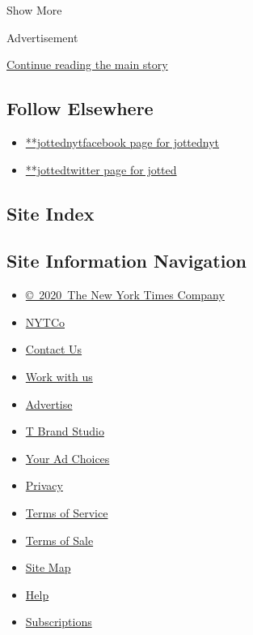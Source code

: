 Show More

Advertisement

\protect\hyperlink{after-mid2}{Continue reading the main story}

\hypertarget{follow-elsewhere}{%
\subsection{Follow Elsewhere}\label{follow-elsewhere}}

\begin{itemize}
\tightlist
\item
  \href{https://www.facebook.com/jottednyt}{**jottednytfacebook page for
  jottednyt}
\item
  \href{https://twitter.com/jotted}{**jottedtwitter page for jotted}
\end{itemize}

\hypertarget{site-index}{%
\subsection{Site Index}\label{site-index}}

\hypertarget{site-information-navigation}{%
\subsection{Site Information
Navigation}\label{site-information-navigation}}

\begin{itemize}
\tightlist
\item
  \href{https://help.nytimes.com/hc/en-us/articles/115014792127-Copyright-notice}{©~2020~The
  New York Times Company}
\end{itemize}

\begin{itemize}
\tightlist
\item
  \href{https://www.nytco.com/}{NYTCo}
\item
  \href{https://help.nytimes.com/hc/en-us/articles/115015385887-Contact-Us}{Contact
  Us}
\item
  \href{https://www.nytco.com/careers/}{Work with us}
\item
  \href{https://nytmediakit.com/}{Advertise}
\item
  \href{http://www.tbrandstudio.com/}{T Brand Studio}
\item
  \href{https://www.nytimes.com/privacy/cookie-policy\#how-do-i-manage-trackers}{Your
  Ad Choices}
\item
  \href{https://www.nytimes.com/privacy}{Privacy}
\item
  \href{https://help.nytimes.com/hc/en-us/articles/115014893428-Terms-of-service}{Terms
  of Service}
\item
  \href{https://help.nytimes.com/hc/en-us/articles/115014893968-Terms-of-sale}{Terms
  of Sale}
\item
  \href{https://spiderbites.nytimes.com}{Site Map}
\item
  \href{https://help.nytimes.com/hc/en-us}{Help}
\item
  \href{https://www.nytimes.com/subscription?campaignId=37WXW}{Subscriptions}
\end{itemize}
